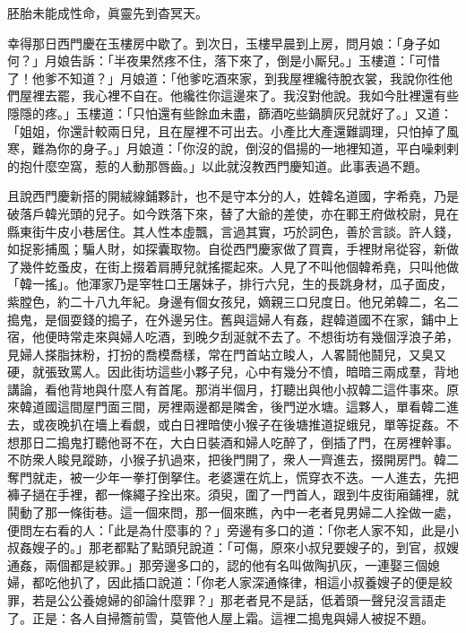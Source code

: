 \begin{myquote} 
胚胎未能成性命，眞靈先到杳冥天。
\end{myquote} 

幸得那日西門慶在玉樓房中歇了。到次日，玉樓早晨到上房，問月娘：「身子如何？」月娘告訴：「半夜果然疼不住，落下來了，倒是小厮兒。」玉樓道：「可惜了！他爹不知道？」月娘道：「他爹吃酒來家，到我屋裡纔待脫衣裳，我說你徃他們屋裡去罷，我心裡不自在。他纔徃你這邊來了。我沒對他說。我如今肚裡還有些隱隱的疼。」玉樓道：「只怕還有些餘血未盡，篩酒吃些鍋臍灰兒就好了。」又道：「姐姐，你還計較兩日兒，且在屋裡不可出去。小產比大產還難調理，只怕掉了風寒，難為你的身子。」月娘道：「你沒的說，倒沒的倡揚的一地裡知道，平白噪剌剌的抱什麼空窩，惹的人動那唇齒。」{}以此就沒教西門慶知道。此事表過不題。

且說西門慶新搭的開絨線鋪夥計，也不是守本分的人，姓韓名道國，字希堯，乃是破落戶韓光頭的兒子。如今跌落下來，替了大爺的差使，亦在鄆王府做校尉，見在縣東街牛皮小巷居住。其人性本虛飄，言過其實，巧於詞色，善於言談。許人錢，如捉影捕風；騙人財，如探囊取物。自從西門慶家做了買賣，手裡財帛從容，新做了幾件虼蚤皮，在街上掇着肩膊兒就搖擺起來。人見了不叫他個韓希堯，只叫他做「韓一搖」。他渾家乃是宰牲口王屠妹子，排行六兒，生的長跳身材，瓜子面皮，紫膛色，約二十八九年紀。身邊有個女孩兒，嫡親三口兒度日。他兄弟韓二，名二搗鬼，是個耍錢的搗子，在外邊另住。舊與這婦人有姦，趕韓道國不在家，鋪中上宿，他便時常走來與婦人吃酒，到晚夕刮涎就不去了。不想街坊有幾個浮浪子弟，見婦人搽脂抹粉，打扮的喬模喬樣，常在門首站立睃人，人畧鬪他鬪兒，又臭又硬，就張致罵人。因此街坊這些小夥子兒，心中有幾分不憤，暗暗三兩成羣，背地講論，看他背地與什麼人有首尾。那消半個月，打聽出與他小叔韓二這件事來。原來韓道國這間屋門面三間，房裡兩邊都是隣舍，後門逆水塘。這夥人，單看韓二進去，或夜晚扒在墻上看覷，或白日裡暗使小猴子在後塘推道捉蛾兒，單等捉姦。不想那日二搗鬼打聽他哥不在，大白日裝酒和婦人吃醉了，倒插了門，在房裡幹事。不防衆人睃見蹤跡，小猴子扒過來，把後門開了，衆人一齊進去，掇開房門。韓二奪門就走，被一少年一拳打倒拏住。老婆還在炕上，慌穿衣不迭。一人進去，先把褲子撾在手裡，都一條繩子拴出來。{}須臾，圍了一門首人，跟到牛皮街廂鋪裡，就鬨動了那一條街巷。這一個來問，那一個來瞧，內中一老者見男婦二人拴做一處，便問左右看的人：「此是為什麼事的？」旁邊有多口的道：「你老人家不知，此是小叔姦嫂子的。」那老都點了點頭兒說道：「可傷，原來小叔兒要嫂子的，到官，叔嫂通姦，兩個都是絞罪。」那旁邊多口的，認的他有名叫做陶扒灰，一連娶三個媳婦，都吃他扒了，因此插口說道：「你老人家深通條律，相這小叔養嫂子的便是絞罪，若是公公養媳婦的卻論什麼罪？」那老者見不是話，低着頭一聲兒沒言語走了。{}正是：各人自掃簷前雪，莫管他人屋上霜。這裡二搗鬼與婦人被捉不題。


